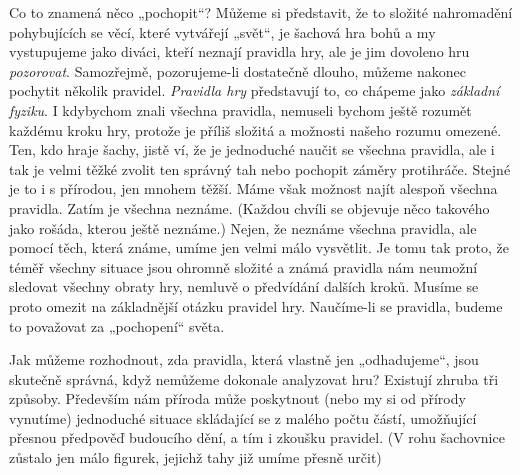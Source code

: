     Co to znamená něco „pochopit“? Můžeme si představit, že to složité nahromadění pohybujících se 
    věcí, které vytvářejí „svět“, je šachová hra bohů a my vystupujeme jako diváci, kteří neznají 
    pravidla hry, ale je jim dovoleno hru \emph{pozorovat}. Samozřejmě, pozorujeme-li dostatečně 
    dlouho, můžeme nakonec pochytit několik pravidel. \emph{Pravidla hry} představují to, co 
    chápeme jako \emph{základní fyziku}. I  kdybychom znali všechna pravidla, nemuseli bychom ještě 
    rozumět každému kroku hry, protože je příliš složitá a možnosti našeho rozumu omezené. 
    Ten, kdo hraje šachy, jistě ví, že je jednoduché naučit se všechna pravidla, ale i tak je velmi 
    těžké zvolit ten správný tah nebo pochopit záměry protihráče. Stejné je to i s přírodou, jen 
    mnohem těžší. Máme však možnost najít alespoň všechna pravidla. Zatím je všechna neznáme. 
    (Každou chvíli se objevuje něco takového jako rošáda, kterou ještě neznáme.) Nejen, že neznáme 
    všechna pravidla, ale pomocí těch, která známe, umíme jen velmi málo vysvětlit. Je tomu tak 
    proto, že téměř všechny situace jsou ohromně složité a známá pravidla nám neumožní sledovat 
    všechny obraty hry, nemluvě o předvídání dalších kroků. Musíme se proto omezit na základnější 
    otázku pravidel hry. Naučíme-li se pravidla, budeme to považovat za „pochopení“ světa.
    
    Jak můžeme rozhodnout, zda pravidla, která vlastně jen „odhadujeme“, jsou skutečně správná, 
    když nemůžeme dokonale analyzovat hru? Existují zhruba tři způsoby. Především nám příroda může 
    poskytnout (nebo my si od přírody vynutíme) jednoduché situace skládající se z malého počtu 
    částí, umožňující přesnou předpověď budoucího dění, a tím i zkoušku pravidel. (V rohu 
    šachovnice zůstalo jen málo figurek, jejichž tahy již umíme přesně určit)

